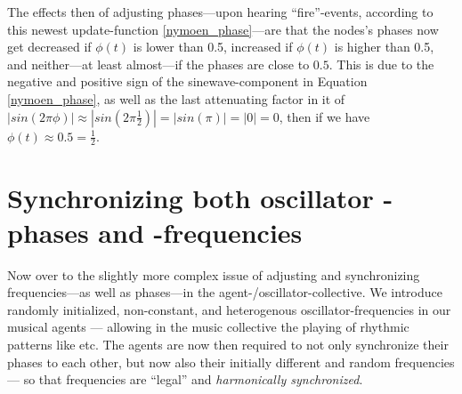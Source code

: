 	The effects then of adjusting phases—upon hearing ``fire''-events, according to this newest update-function \eqref{nymoen_phase}—are that the nodes's phases now get decreased if $\phi(t)$ is lower than 0.5, increased if $\phi(t)$ is higher than 0.5, and neither—at least almost—if the phases are close to $0.5$. This is due to the negative and positive sign of the sinewave-component in Equation \eqref{nymoen_phase}, as well as the last attenuating factor in it of $| sin(2\pi\phi) | \approx | sin(2\pi \frac{1}{2}) | = | sin(\pi) | = | 0 | = 0$, then if we have $\phi(t) \approx 0.5 = \frac{1}{2}$.

	
	
	
	
	
	










	

\section{Synchronizing both oscillator -phases and -frequencies}
\label{sec:frequency_methods}

	Now over to the slightly more complex issue of adjusting and synchronizing frequencies—as well as phases—in the agent-/oscillator-collective. We introduce randomly initialized, non-constant, and heterogenous oscillator-frequencies in our musical agents — allowing in the music collective the playing of rhythmic patterns like  etc. The agents are now then required to not only synchronize their phases to each other, but now also their initially different and random frequencies — so that frequencies are ``legal'' and \textit{harmonically synchronized}.
	
